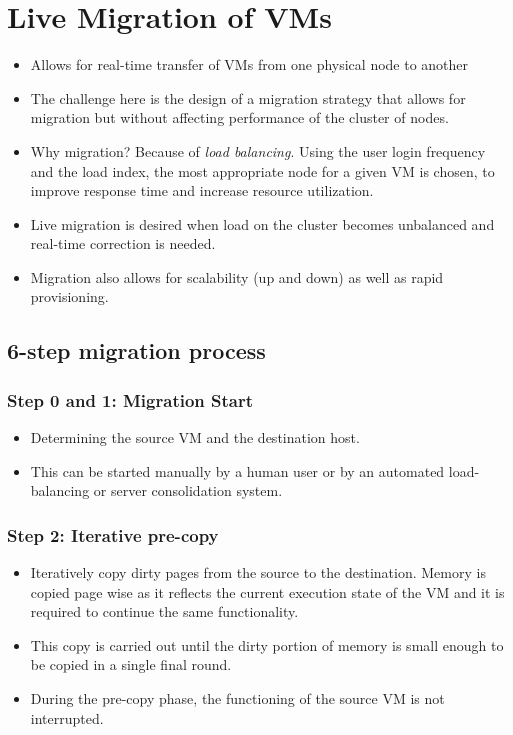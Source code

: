 \documentclass{article}
\begin{document}
\section{Live Migration of VMs}
\begin{itemize}
    \item Allows for real-time transfer of VMs from one physical node to another
    
    \item The challenge here is the design of a migration strategy that allows for migration but without affecting performance of the cluster of nodes.
    
    \item Why migration? Because of \textit{load balancing}. Using the user login frequency and the load index, the most appropriate node for a given VM is chosen, to improve response time and increase resource utilization.
    
    \item Live migration is desired when load on the cluster becomes unbalanced and real-time correction is needed. 
    
    \item Migration also allows for scalability (up and down) as well as rapid provisioning. 
\end{itemize}

\subsection{6-step migration process}
\subsubsection{Step 0 and 1: Migration Start}
\begin{itemize}
    \item Determining the source VM and the destination host. 
    
    \item This can be started manually by a human user or by an automated load-balancing or server consolidation system.
\end{itemize}

\subsubsection{Step 2: Iterative pre-copy}
\begin{itemize}
    \item Iteratively copy dirty pages from the source to the destination. Memory is copied page wise as it reflects the current execution state of the VM and it is required to continue the same functionality.
    
    \item This copy is carried out until the dirty portion of memory is small enough to be copied in a single final round. 
    
    \item During the pre-copy phase, the functioning of the source VM is not interrupted. 
\end{itemize}
\end{document}
